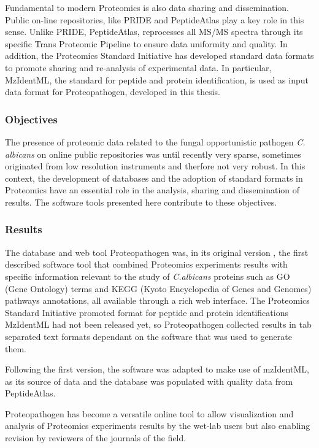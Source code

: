 Fundamental to modern Proteomics is also data sharing and dissemination. 
Public on-line repositories, like PRIDE and PeptideAtlas play a key role in 
this sense. Unlike PRIDE, PeptideAtlas, reprocesses all MS/MS spectra through
its specific Trans Proteomic Pipeline to ensure data uniformity and quality.
In addition, the Proteomics Standard Initiative has developed standard data formats 
to promote sharing and re-analysis of experimental data. In particular,
MzIdentML, the standard for peptide and protein identification,
 is used as input data format for Proteopathogen, developed in this thesis.



\subsubsection*{Objectives}
The presence of proteomic data related to the fungal opportunistic 
pathogen \textit{C. albicans} on online public repositories was
until recently very sparse, sometimes originated from low resolution
instruments and therfore not very robust.
In this context, the development of databases and the adoption
of standard formats in Proteomics have an essential role in the analysis,
sharing and dissemination of results. The software tools presented here 
contribute to these objectives.

\subsubsection*{Results}
The database and web tool Proteopathogen was, in its original version
\citep{Vialas2009b},
the first described software tool
that combined Proteomics experiments results with specific information 
relevant to the study of \textit{C.albicans} proteins such as GO (Gene Ontology)
terms and KEGG (Kyoto Encyclopedia of Genes and Genomes) pathways annotations,
all available through a rich web interface.
The Proteomics Standard Initiative promoted format for peptide and protein
identifications MzIdentML had not been released yet, so Proteopathogen
collected results in tab separated text formats dependant on the software
that was used to generate them.

Following the first version, the software was adapted to make use of
mzIdentML, as its source of data
\citep{Vialas2015} and the database was populated with quality data from PeptideAtlas.

Proteopathogen has become a versatile online tool to allow
visualization and analysis of Proteomics experiments results by the wet-lab 
users but also enabling revision by reviewers of the journals of the field.



